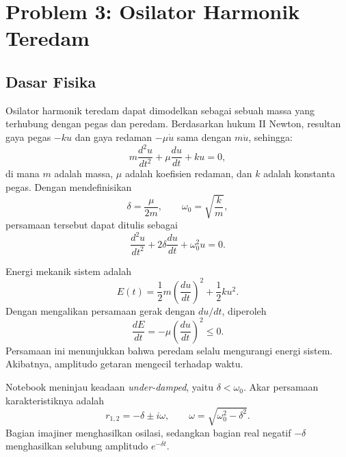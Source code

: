 \documentclass[12pt, letterpaper]{article}
\begin{document}
\section{Problem 3: Osilator Harmonik Teredam}

\subsection{Dasar Fisika}

Osilator harmonik teredam dapat dimodelkan sebagai sebuah massa yang terhubung
dengan pegas dan peredam. Berdasarkan hukum II Newton, resultan gaya pegas
$-ku$ dan gaya redaman $-\mu \dot{u}$ sama dengan $m\ddot{u}$, sehingga:
\begin{equation}
    m \frac{d^2u}{dt^2} + \mu \frac{du}{dt} + ku = 0,
\end{equation}
di mana $m$ adalah massa, $\mu$ adalah koefisien redaman, dan $k$ adalah
konstanta pegas. Dengan mendefinisikan
\begin{equation}
    \delta = \frac{\mu}{2m},
    \qquad
    \omega_0 = \sqrt{\frac{k}{m}},
\end{equation}
persamaan tersebut dapat ditulis sebagai
\begin{equation}
    \frac{d^2u}{dt^2} + 2\delta\frac{du}{dt} + \omega_0^2u = 0.
\end{equation}

Energi mekanik sistem adalah
\begin{equation}
    E(t)=\frac{1}{2}m\left(\frac{du}{dt}\right)^2
         +\frac{1}{2}ku^2.
\end{equation}
Dengan mengalikan persamaan gerak dengan $du/dt$, diperoleh
\begin{equation}
    \frac{dE}{dt}=-\mu\left(\frac{du}{dt}\right)^2 \leq 0.
\end{equation}
Persamaan ini menunjukkan bahwa peredam selalu mengurangi energi sistem.
Akibatnya, amplitudo getaran mengecil terhadap waktu.

Notebook meninjau keadaan \textit{under-damped}, yaitu $\delta<\omega_0$.
Akar persamaan karakteristiknya adalah
\begin{equation}
    r_{1,2}=-\delta\pm i\omega,
    \qquad
    \omega=\sqrt{\omega_0^2-\delta^2}.
\end{equation}
Bagian imajiner menghasilkan osilasi, sedangkan bagian real negatif
$-\delta$ menghasilkan selubung amplitudo $e^{-\delta t}$.
\end{document}
